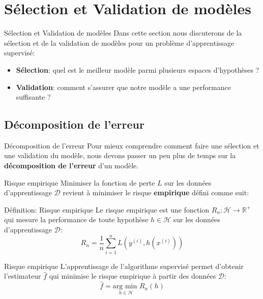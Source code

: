 \section[Sélection et Validation de modèles]{Sélection et Validation de modèles}

\begin{frame}{Sélection et Validation de modèles}
	Dans cette section nous discuterons de la sélection et de la validation de modèles pour un problème d'apprentissage supervisé: \\
	\vspace{0.5cm}
	\begin{itemize}
		\item \textbf{Sélection}: quel est le meilleur modèle parmi plusieurs espaces d'hypothèses ?
		\item \textbf{Validation}: comment s'assurer que notre modèle a une performance suffisante ?
	\end{itemize}
\end{frame}

\subsection{Décomposition de l'erreur}

\begin{frame}{Décomposition de l'erreur}
	Pour mieux comprendre comment faire une sélection et une validation du modèle, nous devons passer un peu plus de temps sur la \textbf{décomposition de l'erreur} d'un modèle.
\end{frame}

\begin{frame}{Risque empirique}
	Minimiser la fonction de perte $L$ sur les données d'apprentissage $\mathcal{D}$ revient à minimiser le risque \textbf{empirique} défini comme suit:
	\begin{block}{Définition: Risque empirique}
		Le risque empirique est une fonction $R_n: \mathcal{H} \to \mathbb{R}^+$ qui mesure la performance de toute hypothèse $h \in \mathcal{H}$ sur les données d'apprentissage $\mathcal{D}$:
		\begin{equation}
			R_n = \frac{1}{n} \sum_{i=1}^n L\left(y^{(i)}, h\left(x^{(i)}\right)\right)
			\nonumber
		\end{equation}
		\hfill
	\end{block}
\end{frame}

\begin{frame}{Risque empirique}
	L'apprentissage de l'algorithme supervisé permet d'obtenir l'estimateur $\hat{f}$ qui minimise le risque empirique à partir des données $\mathcal{D}$:
	\begin{equation}
		\hat{f} = \underset{h \in \mathcal{H}}{\text{arg min  }}R_n(h)
		\nonumber
	\end{equation}
\end{frame}

